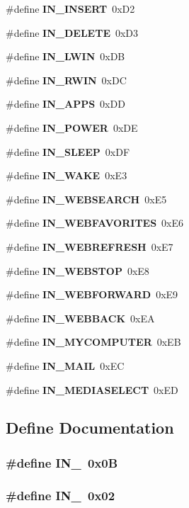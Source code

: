 \begin{CompactItemize}
\item 
\#define {\bf IN\_\-INSERT}~0xD2
\item 
\#define {\bf IN\_\-DELETE}~0xD3
\item 
\#define {\bf IN\_\-LWIN}~0xDB
\item 
\#define {\bf IN\_\-RWIN}~0xDC
\item 
\#define {\bf IN\_\-APPS}~0xDD
\item 
\#define {\bf IN\_\-POWER}~0xDE
\item 
\#define {\bf IN\_\-SLEEP}~0xDF
\item 
\#define {\bf IN\_\-WAKE}~0xE3
\item 
\#define {\bf IN\_\-WEBSEARCH}~0xE5
\item 
\#define {\bf IN\_\-WEBFAVORITES}~0xE6
\item 
\#define {\bf IN\_\-WEBREFRESH}~0xE7
\item 
\#define {\bf IN\_\-WEBSTOP}~0xE8
\item 
\#define {\bf IN\_\-WEBFORWARD}~0xE9
\item 
\#define {\bf IN\_\-WEBBACK}~0xEA
\item 
\#define {\bf IN\_\-MYCOMPUTER}~0xEB
\item 
\#define {\bf IN\_\-MAIL}~0xEC
\item 
\#define {\bf IN\_\-MEDIASELECT}~0xED
\end{CompactItemize}


\subsection{Define Documentation}
\subsubsection{\setlength{\rightskip}{0pt plus 5cm}\#define IN\_~0x0B}\label{in__keycodes_8h_97959e97eac8414a33f62b57909dafd1}


\subsubsection{\setlength{\rightskip}{0pt plus 5cm}\#define IN\_~0x02}\label{in__keycodes_8h_9f96581595ba16bf7696cde741877e1a}


